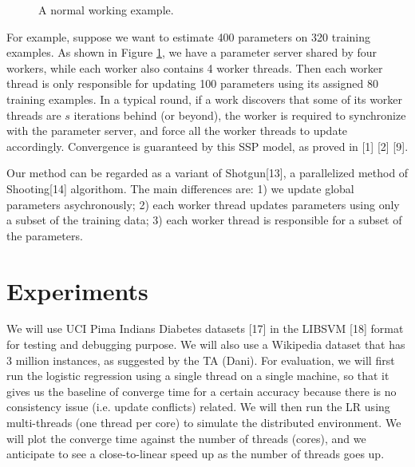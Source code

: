 \documentclass{article} %
\begin{document}
\begin{figure}[h]
\begin{center}
\end{center}
\caption{A normal working example.}
\label{example}
\end{figure}
For example, suppose we want to estimate 400 parameters on 320 training examples. As shown in Figure \ref{example}, we have a parameter server shared by four workers, while each worker also contains 4 worker threads. Then each worker thread is only responsible for updating 100 parameters using its assigned 80 training examples. In a typical round, if a work discovers that some of its worker threads are $s$ iterations behind (or beyond), the worker is required to synchronize with the parameter server, and force all the worker threads to update accordingly. Convergence is guaranteed by this SSP model, as proved in [1] [2] [9].

Our method can be regarded as a variant of Shotgun[13], a parallelized method of Shooting[14] algorithom. The main differences are: 1) we update global parameters asychronously; 2) each worker thread updates parameters using only a subset of the training data; 3) each worker thread is responsible for a subset of the parameters. 

\section{Experiments}
\label{others}
We will use UCI Pima Indians Diabetes datasets [17] in the LIBSVM [18] format for testing and debugging purpose.
We will also use a Wikipedia dataset that has 3 million instances, as suggested by the TA (Dani). For evaluation, we will first run the logistic regression using a single thread on a single machine, so that it gives us the baseline of converge time for a certain accuracy because there is no consistency issue (i.e. update conflicts) related. We will then run the LR using multi-threads (one thread per core) to simulate the distributed environment. We will plot the converge time against the number of threads (cores), and we anticipate to see a close-to-linear speed up as the number of threads goes up.
\end{document}
